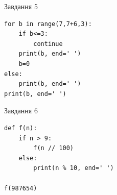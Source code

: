 \documentclass[12pt, ukrainian]{article}
\begin{document}
{\vspace{15mm}
\begin{minipage}[t]{9.7cm}                
{\begin{center}Завдання {5}\end{center}}
\begin{verbatim}
for b in range(7,7+6,3):
    if b<=3:
        continue
    print(b, end=' ')
    b=0
else:
    print(b, end=' ')
print(b, end=' ')
\end{verbatim}     
\end{minipage}
\vline \hspace{8mm}
\begin{minipage}[t]{8.0cm}                
{\begin{center}Завдання {6}\end{center}}
\begin{verbatim}
def f(n):
    if n > 9:
        f(n // 100)
    else:
        print(n % 10, end=' ')

f(987654)
\end{verbatim}     
\end{minipage}

}
\newpage
\end{document}
